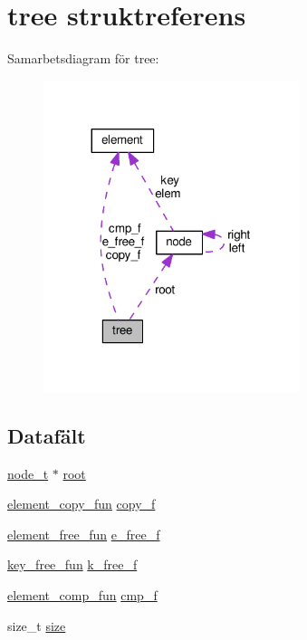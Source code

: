 \hypertarget{structtree}{}\section{tree struktreferens}
\label{structtree}


Samarbetsdiagram för tree\+:\nopagebreak
\begin{figure}[H]
\begin{center}
\leavevmode
\includegraphics[width=212pt]{structtree__coll__graph}
\end{center}
\end{figure}
\subsection*{Datafält}
\begin{DoxyCompactItemize}
\item 
\hyperlink{tree_8h_a7c02633e18d6aa5f58539b75f08753d9}{node\+\_\+t} $\ast$ \hyperlink{structtree_a1c9d515ea8291ba3e8dd27a32ad11c99}{root}
\item 
\hyperlink{common_8h_a0ca91ee5ad428d2cb3161e07618bd21c}{element\+\_\+copy\+\_\+fun} \hyperlink{structtree_a612e416ae22a51e05773a4ed5a673a95}{copy\+\_\+f}
\item 
\hyperlink{common_8h_a66551bc5a869ff55fd6e97cdf83f9e27}{element\+\_\+free\+\_\+fun} \hyperlink{structtree_a52ca9019231724325da51c920ba98b83}{e\+\_\+free\+\_\+f}
\item 
\hyperlink{tree_8h_aa6e72bc7040d433d1054d4f89e0b3493}{key\+\_\+free\+\_\+fun} \hyperlink{structtree_a2a6ff28f2b42cea10f416f6e0fd4f540}{k\+\_\+free\+\_\+f}
\item 
\hyperlink{common_8h_a1ae319bacbeb687146c87de665a96b35}{element\+\_\+comp\+\_\+fun} \hyperlink{structtree_a4bbea9002bc047957acc4672113cac7c}{cmp\+\_\+f}
\item 
size\+\_\+t \hyperlink{structtree_a794fa86f6b2815f255a79b3a46fdb190}{size}
\end{DoxyCompactItemize}


